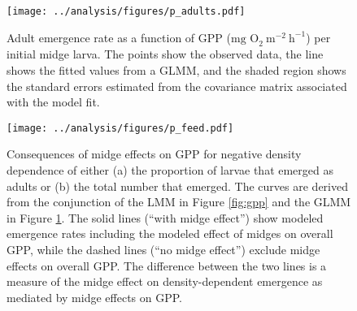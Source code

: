 \documentclass[12pt]{article}
\begin{document}
\clearpage




\begin{figure}
\centering
\texttt{[image: ../analysis/figures/p\_adults.pdf]}
\caption{\label{fig:adults}
Adult emergence rate as a function of GPP ($\text{mg O}_2~\text{m}^{-2}~\text{h}^{-1}$) 
per initial midge larva.
The points show the observed data, 
the line shows the fitted values from a GLMM,
and the shaded region shows the standard errors estimated from the 
covariance matrix associated with the model fit.
}
\end{figure}

\clearpage


\begin{figure}
\centering
\texttt{[image: ../analysis/figures/p\_feed.pdf]}
\caption{\label{fig:feed}
Consequences of midge effects on GPP for negative density dependence of 
either (a) the proportion of larvae that emerged as adults or 
(b) the total number that emerged.
The curves are derived from the conjunction of the LMM in Figure \ref{fig:gpp}
and the GLMM in Figure \ref{fig:adults}. 
The solid lines (``with midge effect'') show modeled emergence rates including the modeled
effect of midges on overall GPP,
while the dashed lines (``no midge effect'') exclude midge effects on overall GPP.
The difference between the two lines is a measure of the midge effect on density-dependent
emergence as mediated by midge effects on GPP. 
}
\end{figure}

\clearpage





\end{document}
